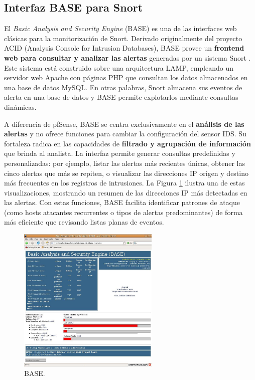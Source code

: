 \documentclass[11pt,a4paper,twoside]{report}
\begin{document}
\subsection{Interfaz BASE para Snort}
El \emph{Basic Analysis and Security Engine} (BASE) es una de las interfaces web clásicas para la monitorización de Snort. Derivado originalmente del proyecto ACID (Analysis Console for Intrusion Databases), BASE provee un \textbf{frontend web para consultar y analizar las alertas} generadas por un sistema Snort \cite{base}. Este sistema está construido sobre una arquitectura LAMP, empleando un servidor web Apache con páginas PHP que consultan los datos almacenados en una base de datos MySQL. En otras palabras, Snort almacena sus eventos de alerta en una base de datos y BASE permite explotarlos mediante consultas dinámicas.\newline

A diferencia de pfSense, BASE se centra exclusivamente en el \textbf{análisis de las alertas} y no ofrece funciones para cambiar la configuración del sensor IDS. Su fortaleza radica en las capacidades de 
\textbf{filtrado y agrupación de información} que brinda al analista. La interfaz permite generar consultas predefinidas y personalizadas: por ejemplo, listar las alertas más recientes únicas, obtener las cinco alertas que más se repiten, o visualizar las direcciones IP origen y destino más frecuentes en los registros de intrusiones. La Figura \ref{fig:base-stats} ilustra una de estas visualizaciones, mostrando un resumen de las direcciones IP más detectadas en las alertas. Con estas funciones, BASE facilita identificar patrones de ataque (como hosts atacantes recurrentes o tipos de alertas predominantes) de forma más eficiente que revisando listas planas de eventos.\newline

\begin{figure}[H]
	\centering
	\includegraphics[width=0.6\textwidth]{documento/2.png}
	\caption{BASE.}
	\label{fig:base-stats}
\end{figure}
\end{document}
